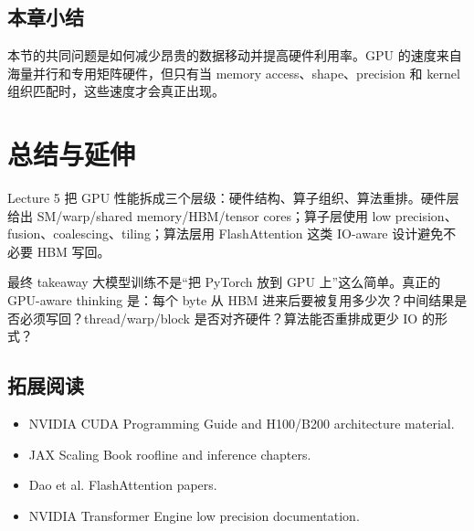 \documentclass[a4paper]{article}
\begin{document}
\subsection{本章小结}
本节的共同问题是如何减少昂贵的数据移动并提高硬件利用率。GPU 的速度来自海量并行和专用矩阵硬件，但只有当 memory access、shape、precision 和 kernel 组织匹配时，这些速度才会真正出现。


\section{总结与延伸}
Lecture 5 把 GPU 性能拆成三个层级：硬件结构、算子组织、算法重排。硬件层给出 SM/warp/shared memory/HBM/tensor cores；算子层使用 low precision、fusion、coalescing、tiling；算法层用 FlashAttention 这类 IO-aware 设计避免不必要 HBM 写回。
\begin{importantbox}{最终 takeaway}
大模型训练不是“把 PyTorch 放到 GPU 上”这么简单。真正的 GPU-aware thinking 是：每个 byte 从 HBM 进来后要被复用多少次？中间结果是否必须写回？thread/warp/block 是否对齐硬件？算法能否重排成更少 IO 的形式？
\end{importantbox}
\subsection{拓展阅读}
\begin{itemize}
    \item NVIDIA CUDA Programming Guide and H100/B200 architecture material.
    \item JAX Scaling Book roofline and inference chapters.
    \item Dao et al. FlashAttention papers.
    \item NVIDIA Transformer Engine low precision documentation.
\end{itemize}
\end{document}

